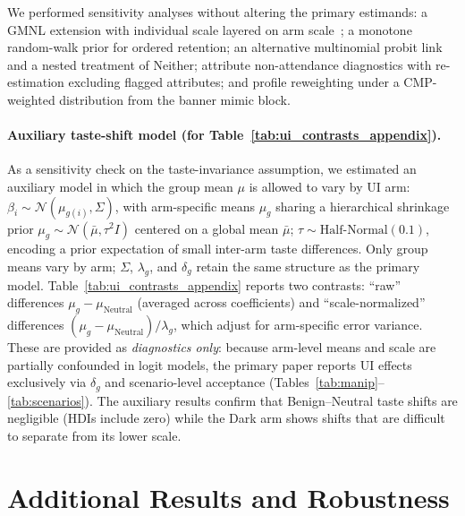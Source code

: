 \documentclass{eusset}
\begin{document}
We performed sensitivity analyses without altering the primary estimands: a GMNL extension with individual scale layered on arm scale~\citep{Fiebig2010GMNL}; a monotone random-walk prior for ordered retention; an alternative multinomial probit link and a nested treatment of Neither; attribute non-attendance diagnostics with re-estimation excluding flagged attributes; and profile reweighting under a CMP-weighted distribution from the banner mimic block.

\paragraph{Auxiliary taste-shift model (for Table~\ref{tab:ui_contrasts_appendix}).}
As a sensitivity check on the taste-invariance assumption, we estimated an auxiliary model in which the group mean $\mu$ is allowed to vary by UI arm: $\beta_i \sim \mathcal{N}(\mu_{g(i)},\Sigma)$, with arm-specific means $\mu_g$ sharing a hierarchical shrinkage prior $\mu_g \sim \mathcal{N}(\bar{\mu}, \tau^2 I)$ centered on a global mean $\bar{\mu}$; $\tau \sim \mathrm{Half\text{-}Normal}(0.1)$, encoding a prior expectation of small inter-arm taste differences. Only group means vary by arm; $\Sigma$, $\lambda_g$, and $\delta_g$ retain the same structure as the primary model. Table~\ref{tab:ui_contrasts_appendix} reports two contrasts: ``raw'' differences $\mu_g - \mu_{\text{Neutral}}$ (averaged across coefficients) and ``scale-normalized'' differences $(\mu_g - \mu_{\text{Neutral}})/\lambda_g$, which adjust for arm-specific error variance. These are provided as \emph{diagnostics only}: because arm-level means and scale are partially confounded in logit models, the primary paper reports UI effects exclusively via $\delta_g$ and scenario-level acceptance (Tables~\ref{tab:manip}--\ref{tab:scenarios}). The auxiliary results confirm that Benign--Neutral taste shifts are negligible (HDIs include zero) while the Dark arm shows shifts that are difficult to separate from its lower scale.


\section{Additional Results and Robustness}
\end{document}
